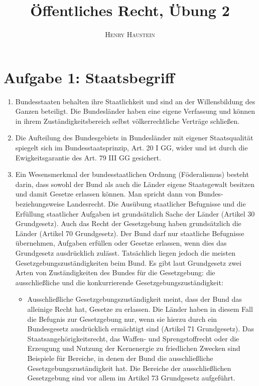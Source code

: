 \documentclass{article}
\title{\textbf{Öffentliches Recht, Übung 2}}
\author{\textsc{Henry Haustein}}
\date{}
\begin{document}
	\maketitle
	
	\section*{Aufgabe 1: Staatsbegriff}
	\begin{enumerate}[label=(\alph*)]
		\item Bundesstaaten behalten ihre Staatlichkeit und sind an der Willensbildung des Ganzen beteiligt. Die Bundesländer haben eine eigene Verfassung und können in ihrem Zuständigkeitsbereich selbst völkerrechtliche Verträge schließen.
		\item Die Aufteilung des Bundesgebiets in Bundesländer mit eigener Staatsqualität spiegelt sich im Bundesstaatsprinzip, Art. 20 I GG, wider und ist durch die Ewigkeitsgarantie des Art. 79 III GG gesichert.
		\item Ein Wesensmerkmal der bundesstaatlichen Ordnung (Föderalismus) besteht darin, dass sowohl der Bund als auch die Länder eigene Staatsgewalt besitzen und damit Gesetze erlassen können. Man spricht dann von Bundes- beziehungsweise Landesrecht. Die Ausübung staatlicher Befugnisse und die Erfüllung staatlicher Aufgaben ist grundsätzlich Sache der Länder (Artikel 30 Grundgesetz). Auch das Recht der Gesetzgebung haben grundsätzlich die Länder (Artikel 70 Grundgesetz). Der Bund darf nur staatliche Befugnisse übernehmen, Aufgaben erfüllen oder Gesetze erlassen, wenn dies das Grundgesetz ausdrücklich zulässt. Tatsächlich liegen jedoch die meisten Gesetzgebungszuständigkeiten beim Bund. Es gibt laut Grundgesetz zwei Arten von Zuständigkeiten des Bundes für die Gesetzgebung: die ausschließliche und die konkurrierende Gesetzgebungszuständigkeit:
		\begin{itemize}
			\item Ausschließliche Gesetzgebungszuständigkeit meint, dass der Bund das alleinige Recht hat, Gesetze zu erlassen. Die Länder haben in diesem Fall die Befugnis zur Gesetzgebung nur, wenn sie hierzu durch ein Bundesgesetz ausdrücklich ermächtigt sind (Artikel 71 Grundgesetz). Das Staatsangehörigkeitsrecht, das Waffen- und Sprengstoffrecht oder die Erzeugung und Nutzung der Kernenergie zu friedlichen Zwecken sind Beispiele für Bereiche, in denen der Bund die ausschließliche Gesetzgebungszuständigkeit hat. Die Bereiche der ausschließlichen Gesetzgebung sind vor allem im Artikel 73 Grundgesetz aufgeführt.

\end{itemize}
\end{enumerate}
\end{document}
